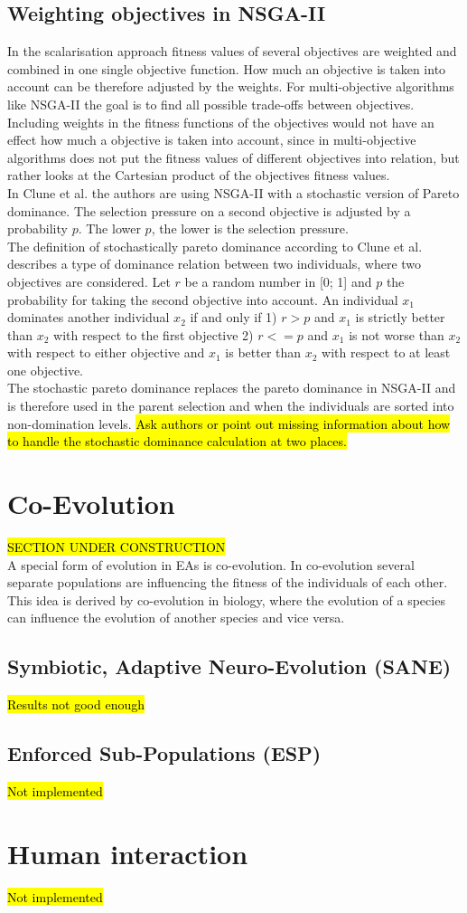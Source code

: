     \subsection{Weighting objectives in NSGA-II}
    In the scalarisation approach fitness values of several objectives are weighted and combined in one single objective function. How much an objective is taken into account can be therefore adjusted by the weights. For multi-objective algorithms like NSGA-II the goal is to find all possible trade-offs between objectives. Including weights in the fitness functions of the objectives would not have an effect how much a objective is taken into account, since in multi-objective algorithms does not put the fitness values of different objectives into relation, but rather looks at the Cartesian product of the objectives fitness values.\\
    In Clune et al.\cite{clune2013evolutionary} the authors are using NSGA-II with a stochastic version of Pareto dominance. The selection pressure on a second objective is adjusted by a probability $p$. The lower $p$, the lower is the selection pressure.\\
    The definition of stochastically pareto dominance according to Clune et al.\cite{clune2013evolutionary} describes a type of dominance relation between two individuals, where two objectives are considered. Let $r$ be a random number in [0; 1] and $p$ the probability for taking the second objective into account. An individual $x_1$ dominates another individual $x_2$ if and only if 1) $r>p$ and $x_1$ is strictly better than $x_2$ with respect to the first objective 2) $r<=p$ and $x_1$ is not worse than $x_2$ with respect to either objective and $x_1$ is better than $x_2$ with respect to at least one objective.\\
    The stochastic pareto dominance replaces the pareto dominance in NSGA-II and is therefore used in the parent selection and when the individuals are sorted into non-domination levels.
    \hl{Ask authors or point out missing information about how to handle the stochastic dominance calculation at two places.}
    
    \section{Co-Evolution}
    \hl{SECTION UNDER CONSTRUCTION}\\
    A special form of evolution in EAs is co-evolution. In co-evolution several separate populations are influencing the fitness of the individuals of each other. This idea is derived by co-evolution in biology, where the evolution of a species can influence the evolution of another species and vice versa.
    
    \subsection{Symbiotic, Adaptive Neuro-Evolution (SANE)}
    \hl{Results not good enough}
    
    \subsection{Enforced Sub-Populations (ESP)}
    \hl{Not implemented}
    
    \section{Human interaction}
    \hl{Not implemented}